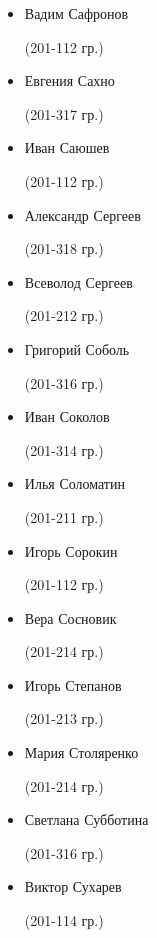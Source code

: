 \begin{multicols}{2}
\begin{small}
\begin{itemize}[leftmargin=0.5em]
	\item[] Вадим Сафронов\begin{tiny} (201-112 гр.)\end{tiny}
	\item[] Евгения Сахно\begin{tiny} (201-317 гр.)\end{tiny} %
	\item[] Иван Саюшев\begin{tiny} (201-112 гр.)\end{tiny}
	\item[] Александр Сергеев\begin{tiny} (201-318 гр.)\end{tiny} %
	\item[] Всеволод Сергеев\begin{tiny} (201-212 гр.)\end{tiny} %
	\item[] Григорий Соболь\begin{tiny} (201-316 гр.)\end{tiny} %
	\item[] Иван Соколов\begin{tiny} (201-314 гр.)\end{tiny} %
	\item[] Илья Соломатин\begin{tiny} (201-211 гр.)\end{tiny}
	\item[] Игорь Сорокин\begin{tiny} (201-112 гр.)\end{tiny}
	\item[] Вера Сосновик\begin{tiny} (201-214 гр.)\end{tiny} %
	\item[] Игорь Степанов\begin{tiny} (201-213 гр.)\end{tiny}
	\item[] Мария Столяренко\begin{tiny} (201-214 гр.)\end{tiny}
	\item[] Светлана Субботина\begin{tiny} (201-316 гр.)\end{tiny} %
	\item[] Виктор Сухарев\begin{tiny} (201-114 гр.)\end{tiny} %


\end{itemize}
\end{small}
\end{multicols}
